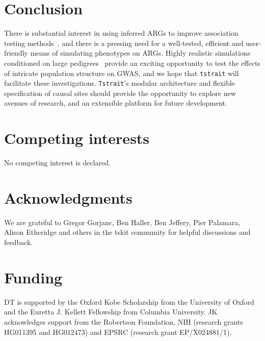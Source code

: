 \documentclass[unnumsec,webpdf,modern,large,namedate]{oup-authoring-template}%
\begin{document}
\section{Conclusion}
There is substantial interest in using inferred ARGs to improve
association testing
methods~\citep{zhang2023,link2023tree,nowbandegani2023extremely},
and there is a pressing need for a well-tested, efficient
and user-friendly means of simulating phenotypes on ARGs.
Highly realistic simulations conditioned on large
pedigrees~\citep{anderson2023} provide an exciting opportunity
to test the effects of intricate population structure on
GWAS, and we hope that \texttt{tstrait} will facilitate these
investigations. \texttt{Tstrait}'s modular architecture
and flexible specification of causal sites
should provide the opportunity to explore new avenues of research,
and an extensible platform for future development.

\section{Competing interests}
No competing interest is declared.

\section{Acknowledgments}
We are grateful to Gregor Gorjanc, Ben Haller, Ben Jeffery, Pier Palamara, Alison Etheridge and
others in the tskit community for helpful discussions and feedback.

\section{Funding}
DT is supported by the Oxford Kobe Scholarship from the University of Oxford
and the Euretta J. Kellett Fellowship from Columbia University.
JK acknowledges support from the Robertson Foundation,
NIH (research grants HG011395 and HG012473) and
EPSRC (research grant EP/X024881/1).





\end{document}
